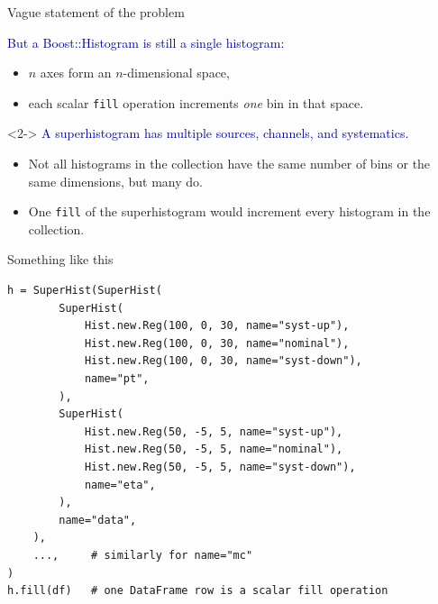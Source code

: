 \documentclass[aspectratio=169]{beamer}
\begin{document}
\begin{frame}{Vague statement of the problem}
\vspace{0.5 cm}
\Large

\textcolor{darkblue}{But a Boost::Histogram is still a single histogram:}

\vspace{0.25 cm}
\begin{itemize}
\item $n$ axes form an $n$-dimensional space,
\item each scalar \texttt{fill} operation increments {\it one} bin in that space.
\end{itemize}

\vspace{0.75 cm}
\begin{uncoverenv}<2->
\textcolor{darkblue}{A superhistogram has multiple sources, channels, and systematics.}

\vspace{0.25 cm}
\begin{itemize}
\item Not all histograms in the collection have the same number of bins or the same dimensions, but many do.
\item One \texttt{fill} of the superhistogram would increment every histogram in the collection.
\end{itemize}
\end{uncoverenv}
\end{frame}

\begin{frame}[fragile]{Something like this}
\vspace{0.15 cm}
\small
\begin{verbatim}
h = SuperHist(SuperHist(
        SuperHist(
            Hist.new.Reg(100, 0, 30, name="syst-up"),
            Hist.new.Reg(100, 0, 30, name="nominal"),
            Hist.new.Reg(100, 0, 30, name="syst-down"),
            name="pt",
        ),
        SuperHist(
            Hist.new.Reg(50, -5, 5, name="syst-up"),
            Hist.new.Reg(50, -5, 5, name="nominal"),
            Hist.new.Reg(50, -5, 5, name="syst-down"),
            name="eta",
        ),
        name="data",
    ),
    ...,     # similarly for name="mc"
)
h.fill(df)   # one DataFrame row is a scalar fill operation
\end{verbatim}
\end{frame}
\end{document}

